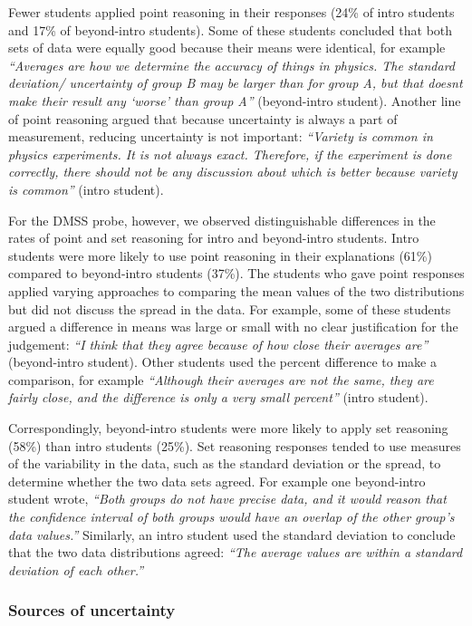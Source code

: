 \documentclass[english,aps,prstper,reprint,showpacs,longbibliography,superscriptaddress,nofootinbib]{revtex4-2}
\begin{document}
Fewer students applied point reasoning in their responses (24\% of intro students and 17\% of beyond-intro students). Some of these students concluded that both sets of data were equally good because their means were identical, for example \textit{``Averages are how we determine the accuracy of things in physics. The standard deviation/ uncertainty of group B may be larger than for group A, but that doesnt make their result any `worse' than group A''} (beyond-intro student). Another line of point reasoning argued that because uncertainty is always a part of measurement, reducing uncertainty is not important: \textit{``Variety is common in physics experiments. It is not always exact. Therefore, if the experiment is done correctly, there should not be any discussion about which is better because variety is common''} (intro student).

For the DMSS probe, however, we observed distinguishable differences in the rates of point and set reasoning for intro and beyond-intro students. Intro students were more likely to use point reasoning in their explanations (61\%) compared to beyond-intro students (37\%). The students who gave point responses applied varying approaches to comparing the mean values of the two distributions but did not discuss the spread in the data. For example, some of these students argued a difference in means was large or small with no clear justification for the judgement: \textit{``I think that they agree because of how close their averages are''} (beyond-intro student). Other students used the percent difference to make a comparison, for example \textit{``Although their averages are not the same, they are fairly close, and the difference is only a very small percent''} (intro student).

Correspondingly, beyond-intro students were more likely to apply set reasoning (58\%) than intro students (25\%). Set reasoning responses tended to use measures of the variability in the data, such as the standard deviation or the spread, to determine whether the two data sets agreed. For example one beyond-intro student wrote, \textit{``Both groups do not have precise data, and it would reason that the confidence interval of both groups would have an overlap of the other group's data values.''} Similarly, an intro student used the standard deviation to conclude that the two data distributions agreed: \textit{``The average values are within a standard deviation of each other.''}


\subsubsection{Sources of uncertainty}
\end{document}
